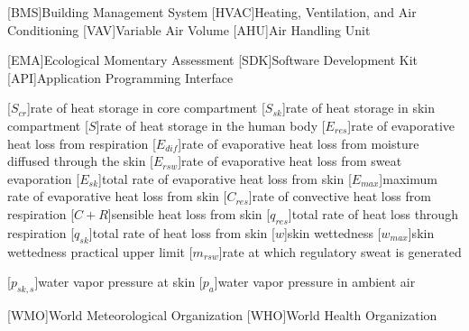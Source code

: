 \begin{acronym}[longest]
    [BMS]{Building Management System}
    [HVAC]{Heating, Ventilation, and Air Conditioning}
    [VAV]{Variable Air Volume}
    [AHU]{Air Handling Unit}

    [EMA]{Ecological Momentary Assessment}
    [SDK]{Software Development Kit}
    [API]{Application Programming Interface}

    [$S_{cr}$]{rate of heat storage in core compartment}
    [$S_{sk}$]{rate of heat storage in skin compartment}
    [$S$]{rate of heat storage in the human body}
    [$E_{res}$]{rate of evaporative heat loss from respiration}
    [$E_{dif}$]{rate of evaporative heat loss from moisture diffused through the skin}
    [$E_{rsw}$]{rate of evaporative heat loss from sweat evaporation}
    [$E_{sk}$]{total rate of evaporative heat loss from skin}
    [$E_{max}$]{maximum rate of evaporative heat loss from skin}
    [$C_{res}$]{rate of convective heat loss from respiration}
    [$C + R$]{sensible heat loss from skin}
    [$q_{res}$]{total rate of heat loss through respiration}
    [$q_{sk}$]{total rate of heat loss from skin}
    [$w$]{skin wettedness}
    [$w_{max}$]{skin wettedness practical upper limit}
    [$m_{rsw}$]{rate at which regulatory sweat is generated} %

    [$p_{sk,s}$]{water vapor pressure at skin}
    [$p_{a}$]{water vapor pressure in ambient air}

    [WMO]{World Meteorological Organization}
    [WHO]{World Health Organization}

\end{acronym}
\renewcommand{\baselinestretch}{1}\normalsize
